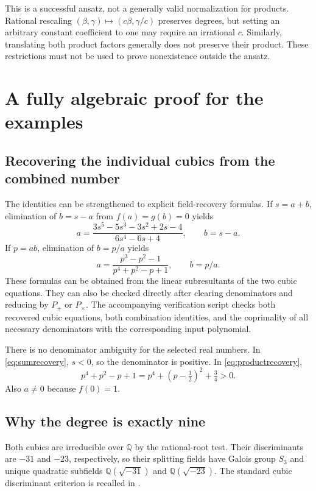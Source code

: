 \documentclass[11pt,letterpaper]{article}
\theoremstyle{definition}
\newcommand{\Q}{\mathbb Q}
\begin{document}
This is a successful ansatz, not a generally valid normalization for products. Rational rescaling $(\beta,\gamma)\mapsto(c\beta,\gamma/c)$ preserves degrees, but setting an arbitrary constant coefficient to one may require an irrational $c$. Similarly, translating both product factors generally does not preserve their product. These restrictions must not be used to prove nonexistence outside the ansatz.

\section{A fully algebraic proof for the examples}
\subsection{Recovering the individual cubics from the combined number}
The identities can be strengthened to explicit field-recovery formulas. If $s=a+b$, elimination of $b=s-a$ from $f(a)=g(b)=0$ yields
\begin{equation}\label{eq:sumrecovery}
 a=\frac{3s^5-5s^3-3s^2+2s-4}{6s^4-6s+4},\qquad b=s-a.
\end{equation}
If $p=ab$, elimination of $b=p/a$ yields
\begin{equation}\label{eq:productrecovery}
 a=\frac{p^3-p^2-1}{p^4+p^2-p+1},\qquad b=p/a.
\end{equation}
These formulas can be obtained from the linear subresultants of the two cubic equations. They can also be checked directly after clearing denominators and reducing by $P_+$ or $P_{\times}$. The accompanying verification script checks both recovered cubic equations, both combination identities, and the coprimality of all necessary denominators with the corresponding input polynomial.

There is no denominator ambiguity for the selected real numbers. In \eqref{eq:sumrecovery}, $s<0$, so the denominator is positive. In \eqref{eq:productrecovery},
\[
 p^4+p^2-p+1=p^4+(p-\tfrac12)^2+\tfrac34>0.
\]
Also $a\ne0$ because $f(0)=1$.

\subsection{Why the degree is exactly nine}
Both cubics are irreducible over $\Q$ by the rational-root test. Their discriminants are $-31$ and $-23$, respectively, so their splitting fields have Galois group $S_3$ and unique quadratic subfields $\Q(\sqrt{-31})$ and $\Q(\sqrt{-23})$. The standard cubic discriminant criterion is recalled in \cite[Section 4]{milne}.
\end{document}
